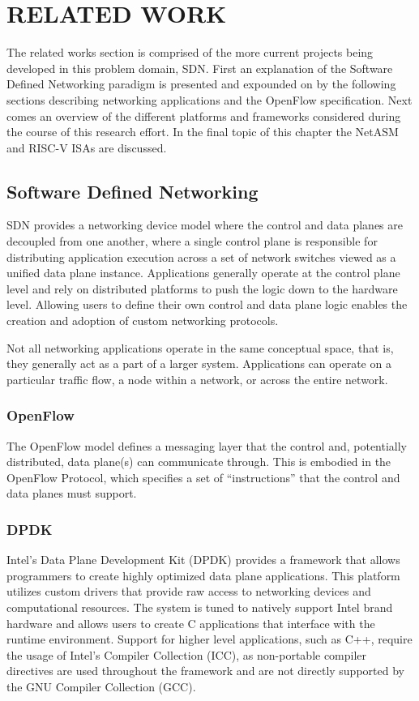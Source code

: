 \chapter{RELATED WORK}
\label{related}
The related works section is comprised of the more current projects being
developed in this problem domain, SDN. First an explanation of the Software
Defined Networking paradigm is presented and expounded on by the following
sections describing networking applications and the OpenFlow \cite{openflow}
specification. Next comes an overview of the different platforms and frameworks
considered during the course of this research effort. In the final topic of
this chapter the NetASM and RISC-V ISAs are discussed.

\section{Software Defined Networking}
\label{related:sdn}
SDN provides a networking device model where the control and data planes are
decoupled from one another, where a single control plane is responsible for
distributing application execution across a set of network switches viewed as
a unified data plane instance. Applications generally operate at the control
plane level and rely on distributed platforms to push the logic down to the hardware level. Allowing users to define their own control and data plane
logic enables the creation and adoption of custom networking protocols.

Not all networking applications operate in the same conceptual space, that is,
they generally act as a part of a larger system. Applications can operate on a
particular traffic flow, a node within a network, or across the entire network.

\subsection{OpenFlow}
\label{related:of}
The OpenFlow \cite{openflow} model defines a messaging layer that the control
and, potentially distributed, data plane(s) can communicate through. This is
embodied in the OpenFlow Protocol, which specifies a set of ``instructions''
that the control and data planes must support.

\subsection{DPDK}
\label{related:dpdk}
Intel's Data Plane Development Kit (DPDK) \cite{dpdk} provides a framework that
allows programmers to create highly optimized data plane applications. This
platform utilizes custom drivers that provide raw access to networking devices
and computational resources. The system is tuned to natively support Intel
brand hardware and allows users to create C applications that interface with
the runtime environment. Support for higher level applications, such as C++,
require the usage of Intel's Compiler Collection (ICC), as non-portable
compiler directives are used throughout the framework and are not directly
supported by the GNU Compiler Collection (GCC).

